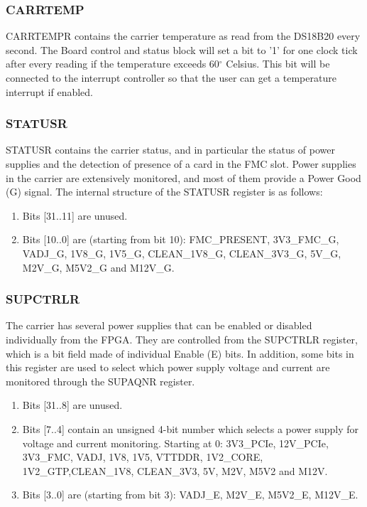 \documentclass{article}
\begin{document}
\subsubsection{CARRTEMP}
CARRTEMPR contains the carrier temperature as read from the DS18B20 every second. The Board control and status block will set a bit to '1' for one clock tick after every reading if the temperature exceeds 60$^\circ$ Celsius. This bit will be connected to the interrupt controller so that the user can get a temperature interrupt if enabled. 

\subsubsection{STATUSR}
STATUSR contains the carrier status, and in particular the status of power supplies and the detection of presence of a card in the FMC slot. Power supplies in the carrier are extensively monitored, and most of them provide a Power Good (G) signal. The internal structure of the STATUSR register is as follows:
\begin{enumerate}
\item Bits [31..11] are unused.
\item Bits [10..0] are (starting from bit 10): FMC\_PRESENT, 3V3\_FMC\_G,  VADJ\_G, 1V8\_G,  1V5\_G,  CLEAN\_1V8\_G, CLEAN\_3V3\_G, 5V\_G, M2V\_G, M5V2\_G and M12V\_G.
\end{enumerate}

\subsubsection{SUPCTRLR}
The carrier has several power supplies that can be enabled or disabled individually from the FPGA. They are controlled from the SUPCTRLR register, which is a bit field made of individual Enable (E) bits. In addition, some bits in this register are used to select which power supply voltage and current are monitored through the SUPAQNR register.
\begin{enumerate}
\item Bits [31..8] are unused.
\item Bits [7..4] contain an unsigned 4-bit number which selects a power supply for voltage and current monitoring. Starting at 0: 3V3\_PCIe, 12V\_PCIe, 3V3\_FMC, VADJ, 1V8, 1V5, VTTDDR, 1V2\_CORE, 1V2\_GTP,\linebreak CLEAN\_1V8, CLEAN\_3V3, 5V, M2V, M5V2 and M12V.
\item Bits [3..0] are (starting from bit 3): VADJ\_E, M2V\_E, M5V2\_E, M12V\_E.
\end{enumerate}
\end{document}
